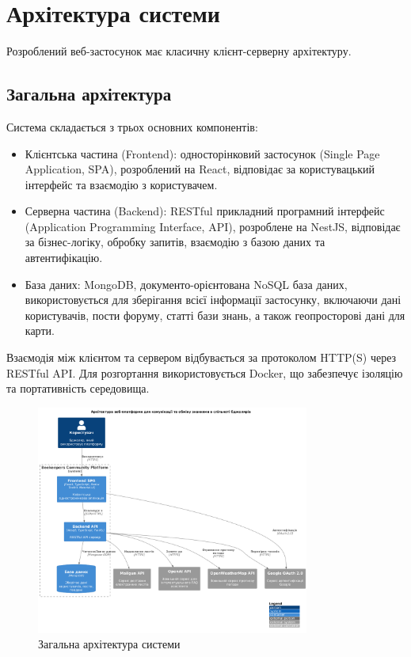 \section{Архітектура системи}
\label{sec:architecture}
Розроблений веб-застосунок має класичну клієнт-серверну архітектуру. 

\subsection{Загальна архітектура}
Система складається з трьох основних компонентів: 
\begin{itemize}
    \item Клієнтська частина (Frontend): односторінковий застосунок (Single Page Application, SPA), розроблений на React, відповідає за користувацький інтерфейс та взаємодію з користувачем.
    \item Серверна частина (Backend): RESTful прикладний програмний інтерфейс (Application Programming Interface, API), розроблене на NestJS, відповідає за бізнес-логіку, обробку запитів, взаємодію з базою даних та автентифікацію.
    \item База даних: MongoDB, документо-орієнтована NoSQL база даних, використовується для зберігання всієї інформації застосунку, включаючи дані користувачів, пости форуму, статті бази знань, а також геопросторові дані для карти.
\end{itemize}
Взаємодія між клієнтом та сервером відбувається за протоколом HTTP(S) через RESTful API. Для розгортання використовується Docker, що забезпечує ізоляцію та портативність середовища.

\begin{figure}[htbp]
  \centering
  \includegraphics[width=0.8\textwidth]{practice_report/images/system_architecture.png}
  \caption{Загальна архітектура системи}
  \label{fig:system_architecture}
\end{figure}

